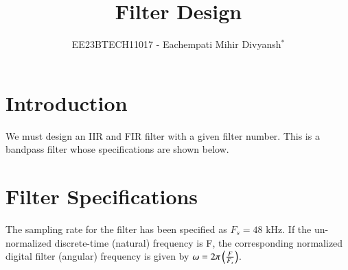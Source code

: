 \documentclass[journal,12pt,twocolumn]{IEEEtran}
\theoremstyle{remark}
\begin{document}

\vspace{3cm}

\title{Filter Design}
\author{EE23BTECH11017 - Eachempati Mihir Divyansh$^{*}$%
}
\maketitle
\newpage
\bigskip

\renewcommand{\thefigure}{\theenumi}
\renewcommand{\thetable}{\theenumi}

    \section{Introduction}
    We must design an IIR and FIR filter with a given filter number. This is a bandpass filter whose specifications are shown below.
    \section{Filter Specifications}
    The sampling rate for the filter has been specified as $F_s =  48$ kHz.	If the un-normalized discrete-time (natural) frequency is F, the corresponding normalized digital filter (angular) frequency is given by $\omega = 2\pi\left(\frac{F}{F_s}\right)$.
\end{document}
